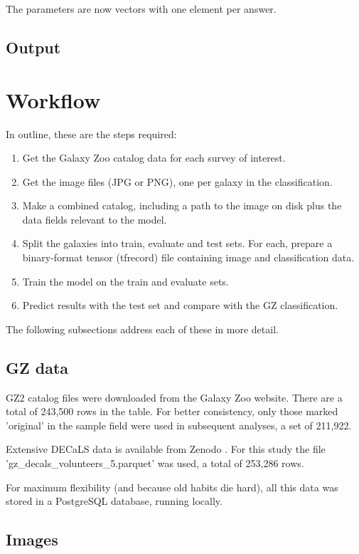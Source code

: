 \documentclass[preprint]{aastex63}
\newcommand{\todo}{\color{red}{TODO}\color{black}\hspace{2mm}}
\begin{document}
The parameters are now vectors with one element per answer.

\subsection{Output}

\todo
\section{Workflow}

In outline, these are the steps required:

\begin{enumerate}
	\item Get the Galaxy Zoo catalog data for each survey of interest.
	\item Get the image files (JPG or PNG), one per galaxy in the classification.
	\item Make a combined catalog, including a path to the image on disk plus the data fields relevant to the model.
	\item Split the galaxies into train, evaluate and test sets. For each, prepare a binary-format tensor (tfrecord) file containing image and classification data.
	\item Train the model on the train and evaluate sets.
	\item Predict results with the test set and compare with the GZ classification.
\end{enumerate}

The following subsections address each of these in more detail.

\subsection{GZ data}

GZ2 catalog files were downloaded from the Galaxy Zoo website.
There are a total of 243,500 rows in the table. For better consistency, only those marked 'original' in the sample field were used in subsequent analyses, a set of 211,922.

Extensive DECaLS data is available from Zenodo \citep{walmsley_mike_2020_4573248}. For this study the file 'gz\_decals\_volunteers\_5.parquet' was used, a total of 253,286 rows.

For maximum flexibility (and because old habits die hard), all this data was stored in a PostgreSQL database, running locally.

\subsection{Images} \label{images}
\end{document}

